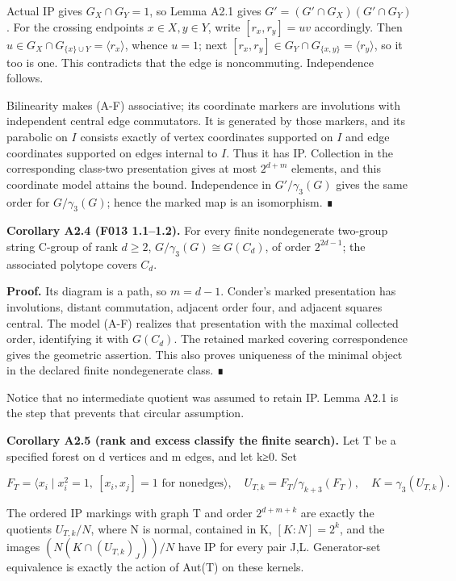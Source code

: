 \documentclass[
  11pt,
  a4paper,
]{article}
\newcounter{none} %
\begin{document}
Actual IP gives \(G_X\cap G_Y=1\), so Lemma A2.1 gives
\(G'=(G'\cap G_X)(G'\cap G_Y)\). For the crossing endpoints
\(x\in X,y\in Y\), write \([r_x,r_y]=uv\) accordingly. Then
\(u\in G_X\cap G_{\{x\}\cup Y}=\langle r_x\rangle\), whence \(u=1\);
next \([r_x,r_y]\in G_Y\cap G_{\{x,y\}}=\langle r_y\rangle\), so it too
is one. This contradicts that the edge is noncommuting. Independence
follows.

Bilinearity makes (A-F) associative; its coordinate markers are
involutions with independent central edge commutators. It is generated
by those markers, and its parabolic on \(I\) consists exactly of vertex
coordinates supported on \(I\) and edge coordinates supported on edges
internal to \(I\). Thus it has IP. Collection in the corresponding
class-two presentation gives at most \(2^{d+m}\) elements, and this
coordinate model attains the bound. Independence in \(G'/\gamma_3(G)\)
gives the same order for \(G/\gamma_3(G)\); hence the marked map is an
isomorphism. ∎

\textbf{Corollary A2.4 (F013 1.1--1.2).} For every finite nondegenerate
two-group string C-group of rank \(d\ge2\),
\(G/\gamma_3(G)\cong G(C_d)\), of order \(2^{2d-1}\); the associated
polytope covers \(C_d\).

\textbf{Proof.} Its diagram is a path, so \(m=d-1\). Conder's marked
presentation has involutions, distant commutation, adjacent order four,
and adjacent squares central. The model (A-F) realizes that presentation
with the maximal collected order, identifying it with \(G(C_d)\). The
retained marked covering correspondence gives the geometric assertion.
This also proves uniqueness of the minimal object in the declared finite
nondegenerate class. ∎

Notice that no intermediate quotient was assumed to retain IP. Lemma
A2.1 is the step that prevents that circular assumption.

\textbf{Corollary A2.5 (rank and excess classify the finite search).}
Let T be a specified forest on d vertices and m edges, and let k≥0. Set

\[
 F_T=\langle x_i\mid x_i^2=1,\ [x_i,x_j]=1\text{ for nonedges}\rangle,
 \quad U_{T,k}=F_T/\gamma_{k+3}(F_T),\quad K=\gamma_3(U_{T,k}).
\]

The ordered IP markings with graph T and order \(2^{d+m+k}\) are exactly
the quotients \(U_{T,k}/N\), where N is normal, contained in K,
\([K:N]=2^k\), and the images \((N(K\cap(U_{T,k})_J))/N\) have IP for
every pair J,L. Generator-set equivalence is exactly the action of
Aut(T) on these kernels.
\end{document}
